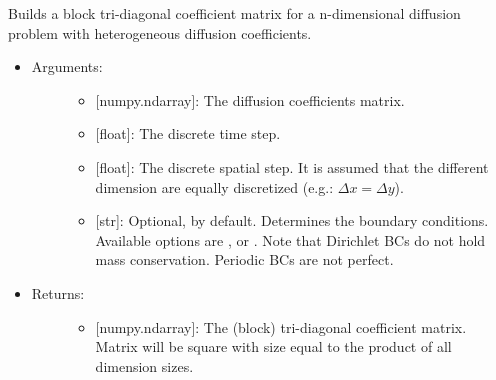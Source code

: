 \documentclass[letterpaper,10pt,english]{sphinxmanual}
\begin{document}

\begin{fulllineitems}
\label{\detokenize{diffusion:data_tools.diffusion.coef_mat_hetero}}
Builds a block tri-diagonal coefficient matrix for a n-dimensional
diffusion problem with heterogeneous diffusion coefficients.
\begin{itemize}
\item {} \begin{description}
\item[{Arguments:}] \leavevmode\begin{itemize}
\item {} 
 {[}numpy.ndarray{]}: The diffusion coefficients matrix.

\item {} 
 {[}float{]}: The discrete time step.

\item {} 
 {[}float{]}: The discrete spatial step. It is assumed that
the different dimension are equally discretized (e.g.:
\(\Delta x = \Delta y\)).

\item {} 
 {[}str{]}: Optional,  by default. Determines
the boundary conditions. Available options are ,
 or . Note that Dirichlet BCs do
not hold mass conservation. Periodic BCs are not perfect.

\end{itemize}

\end{description}

\item {} \begin{description}
\item[{Returns:}] \leavevmode\begin{itemize}
\item {} 
{[}numpy.ndarray{]}: The (block) tri-diagonal coefficient matrix.
Matrix will be square with size equal to the product of all
dimension sizes.

\end{itemize}

\end{description}

\end{itemize}

\end{fulllineitems}
\end{document}
